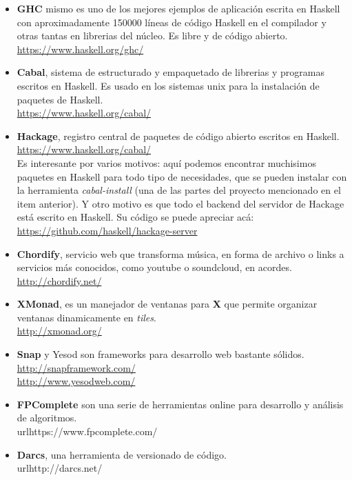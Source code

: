 \begin{itemize}
  \item \textbf{GHC} mismo es uno de los mejores ejemplos de aplicación escrita en Haskell con aproximadamente 150000 líneas de código Haskell en el compilador y otras tantas en librerias del núcleo. Es libre y de código abierto.
  \\ \url{https://www.haskell.org/ghc/}

  \item \textbf{Cabal}, sistema de estructurado y empaquetado de librerias y programas escritos en Haskell. Es usado en los sistemas unix para la instalación de paquetes de Haskell.\\
  \url{https://www.haskell.org/cabal/}

  \item \textbf{Hackage}, registro central de paquetes de código abierto escritos en Haskell. \\
  \url{https://www.haskell.org/cabal/} \\
  Es interesante por varios motivos: aquí podemos encontrar muchisimos paquetes en Haskell para todo tipo de necesidades, que se pueden instalar con la herramienta \textit{cabal-install} (una de las partes del proyecto mencionado en el item anterior). Y otro motivo es que todo el backend del servidor de Hackage está escrito en Haskell. Su código se puede apreciar acá: \\ \url{https://github.com/haskell/hackage-server}

  \item \textbf{Chordify}, servicio web que transforma música, en forma de archivo o links a servicios más conocidos, como youtube o soundcloud, en acordes. \\ \url{http://chordify.net/}

  \item \textbf{XMonad}, es un manejador de ventanas para \textbf{X} que permite organizar ventanas dinamicamente en \textit{tiles}. \\ \url{http://xmonad.org/}

  \item \textbf{Snap} y Yesod son frameworks para desarrollo web bastante sólidos.
  \\ \url{http://snapframework.com/}
  \\ \url{http://www.yesodweb.com/}

  \item \textbf{FPComplete} son una serie de herramientas online para desarrollo y análisis de algoritmos. \\ url{https://www.fpcomplete.com/}

  \item \textbf{Darcs}, una herramienta de versionado de código. \\ url{http://darcs.net/}

  \end{itemize}




